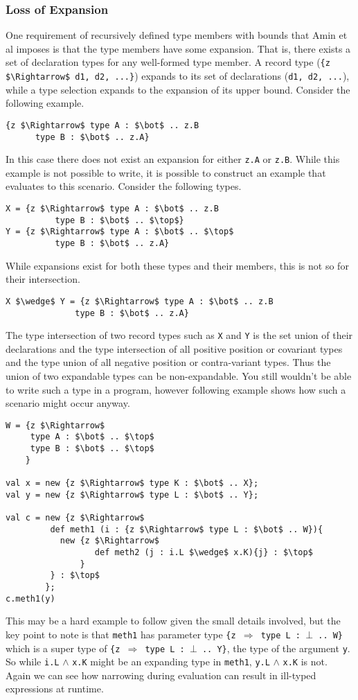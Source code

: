 \documentclass[11pt
              , a4paper
              , twoside
              , openright
              ]{report}
\numberwithin{case}{theorem}
\numberwithin{subcase}{case}
\begin{document}
\subsubsection{Loss of Expansion}
One requirement of recursively defined type members with bounds that Amin et al imposes is that the type members have some expansion. That is, there exists a set of declaration types for any well-formed type member. A record type (\verb|{z $\Rightarrow$ d1, d2, ...}|) expands to its set of declarations (\verb|d1, d2, ...|), while a type selection expands to the expansion of its upper bound. Consider the following example.
\begin{lstlisting}[mathescape, style=customlang]
{z $\Rightarrow$ type A : $\bot$ .. z.B
      type B : $\bot$ .. z.A}
\end{lstlisting}
In this case there does not exist an expansion for either \verb|z.A| or \verb|z.B|. While this example is not possible to write, it is possible to construct an example that evaluates to this scenario. Consider the following types.
\begin{lstlisting}[mathescape, style=customlang]
X = {z $\Rightarrow$ type A : $\bot$ .. z.B
          type B : $\bot$ .. $\top$}
Y = {z $\Rightarrow$ type A : $\bot$ .. $\top$
          type B : $\bot$ .. z.A}
\end{lstlisting}
While expansions exist for both these types and their members, this is not so for their intersection.
\begin{lstlisting}[mathescape, style=customlang]
X $\wedge$ Y = {z $\Rightarrow$ type A : $\bot$ .. z.B
              type B : $\bot$ .. z.A}
\end{lstlisting}
The type intersection of two record types such as \verb|X| and \verb|Y| is the set union of their declarations and the type intersection of all positive position or covariant types and the type union of all negative position or contra-variant types. Thus the union of two expandable types can be non-expandable. You still wouldn't be able to write such a type in a program, however following example shows how such a scenario might occur anyway.
\begin{lstlisting}[mathescape, style=customlang]
W = {z $\Rightarrow$
     type A : $\bot$ .. $\top$
     type B : $\bot$ .. $\top$
    }

val x = new {z $\Rightarrow$ type K : $\bot$ .. X};
val y = new {z $\Rightarrow$ type L : $\bot$ .. Y};

val c = new {z $\Rightarrow$
         def meth1 (i : {z $\Rightarrow$ type L : $\bot$ .. W}){
           new {z $\Rightarrow$
                  def meth2 (j : i.L $\wedge$ x.K){j} : $\top$
               }
         } : $\top$
        };
c.meth1(y)
\end{lstlisting}
This may be a hard example to follow given the small details involved, but the key point to note is that \verb|meth1| has parameter type \verb|{z |$\Rightarrow$\verb| type L : |$\bot$\verb| .. W}| which is a super type of \verb|{z |$\Rightarrow$\verb| type L : |$\bot$\verb| .. Y}|, the type of the argument \verb|y|. So while \verb|i.L| $\wedge$ \verb|x.K| might be an expanding type in \verb|meth1|, \verb|y.L| $\wedge$ \verb|x.K| is not. Again we can see how narrowing during evaluation can result in ill-typed expressions at runtime.
\end{document}
